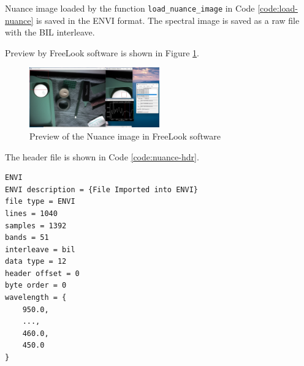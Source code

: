 Nuance image loaded by the function \texttt{load\_nuance\_image} in Code \ref{code:load-nuance} is saved in the ENVI format.
The spectral image is saved as a raw file with the BIL interleave. 

Preview by FreeLook software is shown in Figure \ref{fig:nuance-preview}.

\begin{figure}[H]
    \centering
    \caption{Preview of the Nuance image in FreeLook software}
    \label{fig:nuance-preview}
    \includegraphics[width=0.5\textwidth]{./fig-task2/nuance.jpg}
\end{figure}


The header file is shown in Code \ref{code:nuance-hdr}.

\begin{lstlisting}[caption=Saved ENVI header file, label={code:nuance-hdr}]
ENVI
ENVI description = {File Imported into ENVI}
file type = ENVI
lines = 1040
samples = 1392
bands = 51
interleave = bil
data type = 12
header offset = 0
byte order = 0
wavelength = {
    950.0,
    ...,
    460.0,
    450.0
}

\end{lstlisting}